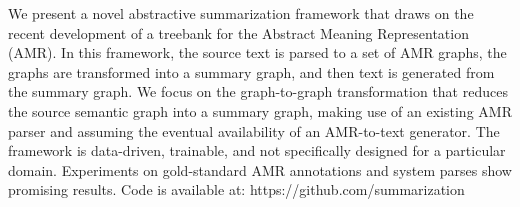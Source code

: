 We present a novel abstractive summarization framework that draws on the recent development of a treebank for the Abstract Meaning Representation (AMR). In this framework, the source text is parsed to a set of AMR graphs, the graphs are transformed into a summary graph, and then text is generated from the summary graph. We focus on the graph-to-graph transformation that reduces the source semantic graph into a summary graph, making use of an existing AMR parser and assuming the eventual availability of an AMR-to-text generator. The framework is data-driven, trainable, and not specifically designed for a particular domain. Experiments on gold-standard AMR annotations and system parses show promising results. Code is available at: https://github.com/summarization
